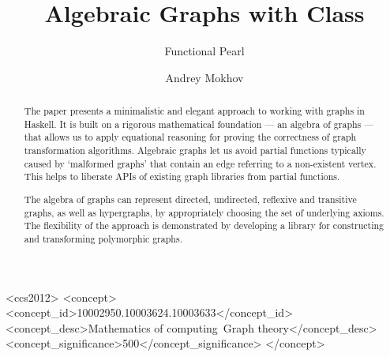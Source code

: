 \documentclass[sigplan]{acmart}\settopmatter{}
\begin{document}
\title{Algebraic Graphs with Class\vspace{-1mm}}
\subtitle{Functional Pearl}

\author{Andrey Mokhov}

\begin{abstract}
The paper presents a minimalistic and elegant approach to working
with graphs in Haskell. It is built on a rigorous
mathematical foundation --- an algebra of graphs --- that allows us to apply
equational reasoning for proving the correctness of graph transformation
algorithms. Algebraic graphs let us avoid partial functions typically
caused by `malformed graphs' that contain an edge referring to
a non-existent vertex. This helps to liberate APIs of existing graph libraries
from partial functions.

The algebra of graphs can represent directed, undirected, reflexive
and transitive graphs, as well as hypergraphs, by appropriately choosing
the set of underlying axioms. The flexibility of the approach is
demonstrated by developing a library for constructing
and transforming polymorphic graphs.
\end{abstract}

\begin{CCSXML}
<ccs2012>
<concept>
<concept_id>10002950.10003624.10003633</concept_id>
<concept_desc>Mathematics of computing~Graph theory</concept_desc>
<concept_significance>500</concept_significance>
</concept>
\end{CCSXML}




\maketitle
\end{document}
